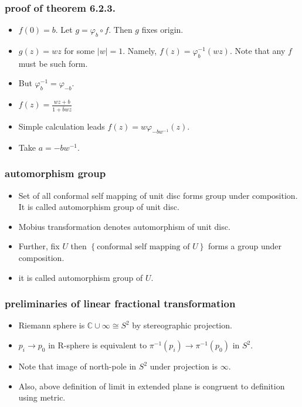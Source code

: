 \documentclass{beamer}
\begin{document}
\begin{frame}
	\frametitle{proof of theorem 6.2.3.}

	\begin{itemize}
		\item $f(0) = b$. Let $g = \varphi_b \circ f$. Then $g$ fixes origin.
		\item $g(z) = wz$ for some $|w| = 1$. Namely, $f(z) = \varphi_b^{-1}(wz)$. Note that any $f$ must be such form.
		\item But $\varphi_b^{-1} = \varphi_{-b}$.
		\item $f(z) = \frac{wz + b}{1+ \bar{b}wz}$
		\item Simple calculation leads $f(z) = w \varphi_{-bw^{-1}}(z)$.
		\item Take $a = -bw^{-1}$.

	\end{itemize}
\end{frame}
\begin{frame}
	\frametitle{automorphism group}
	\begin{itemize}
	
		\item Set of all conformal self mapping of unit disc forms group under composition. It is called automorphism group of unit disc.

		\item Mobius transformation denotes automorphism of unit disc.
		\item Further, fix $U$ then $\left\{ \text{conformal self mapping of }U \right\}$ forms a group under composition.
		\item it is called automorphism group of $U$.
	\end{itemize}

\end{frame}
\begin{frame}
	\frametitle{preliminaries of linear fractional transformation}
	\begin{itemize}
		\item Riemann sphere is $\mathbb{C} \cup \infty \cong S^2$ by stereographic projection.
		\item $p_i \rightarrow p_0$ in R-sphere is equivalent to $\pi^{-1}(p_i) \rightarrow \pi^{-1}(p_0)$ in $S^2$.
		\item Note that image of north-pole in $S^2$ under projection is $\infty$.
		\item Also, above definition of limit in extended plane is congruent to definition using metric.
	\end{itemize}

\end{frame}
\end{document}

